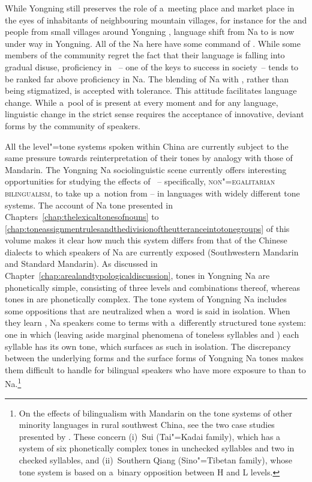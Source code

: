 While Yongning still preserves the role of a~meeting place and market
place in the eyes of inhabitants of neighbouring mountain villages,
for instance for the  and  people from small villages
around Yongning \citep[85]{wellens2006}, language shift from Na to
 is now under way in Yongning. All of the Na here have some
command of . While some members of the community regret the
fact that their language is falling into gradual disuse, proficiency in
~-- one of the keys to success in society~-- tends to be ranked
far above proficiency in Na. The blending of Na with , rather than being stigmatized, is accepted with tolerance. This attitude facilitates language
change. While a~pool of  is present at every moment and for
any language, linguistic change in the strict sense requires the
acceptance of innovative, deviant forms by the community of speakers. 

All the level"=tone systems spoken within China are currently subject to the same pressure towards reinterpretation of their tones by {analogy} with those of {Mandarin}. The Yongning Na sociolinguistic scene currently offers interesting opportunities for
studying the effects of ~-- specifically, \textsc{non"=egalitarian bilingualism}, to take
up a~notion from \citet{haudricourt1961b} – in languages with widely different tone systems. The account of Na
tone presented in Chapters~\ref{chap:thelexicaltonesofnouns} to \ref{chap:toneassignmentrulesandthedivisionoftheutteranceintotonegroups} of this volume
makes it clear how much this system differs from that of the Chinese dialects
to which speakers of Na are currently exposed (Southwestern Mandarin
and Standard Mandarin). As discussed in Chapter~\ref{chap:arealandtypologicaldiscussion}, tones
in Yongning Na are phonetically simple, consisting of three levels and combinations thereof, whereas tones in  are phonetically complex. The
tone system of Yongning Na includes some oppositions that are
neutralized when a~word is said in isolation. When they learn
, Na speakers come to terms with a~differently
structured tone system: one in which (leaving aside marginal phenomena
of toneless syllables and ) each syllable has its own tone,
which surfaces as such in isolation. The discrepancy between the
underlying forms and the surface forms of Yongning Na tones makes them
difficult to handle for bilingual
speakers who have more exposure to  than to Na.\footnote{On the effects of bilingualism with Mandarin on the tone systems of other minority languages in rural southwest China, see the two case studies presented by \citet{stanfordandevans2012}. These concern (i)~Sui (Tai"=Kadai family), which has a system of six phonetically complex tones in unchecked syllables and two in checked syllables, and (ii)~Southern Qiang (Sino"=Tibetan family), whose tone system is based on a~binary opposition between H and L levels.}


